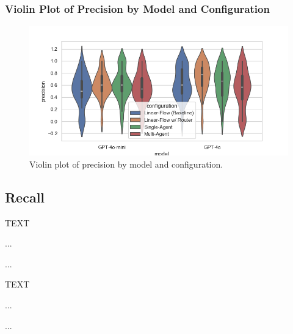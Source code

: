             \subsubsection{Violin Plot of Precision by Model and Configuration}
            \begin{figure}[H]
                \centering
                \includegraphics[scale=0.75]{images_exp2/precision/violin_precision_by_model_and_configuration.png}
                \caption{Violin plot of precision by model and configuration.}
                \label{fig:violin_precision_by_model_and_configuration}
            \end{figure}

        \subsection{Recall}

            TEXT

            ...

            ... 

            
            TEXT

            ...

            ... 

        